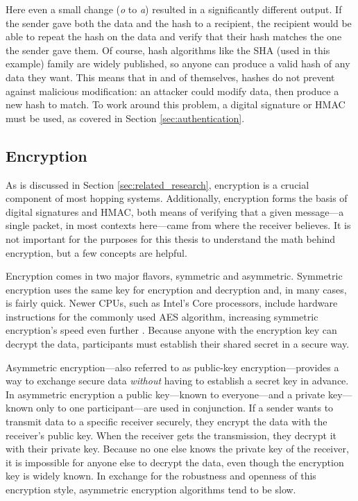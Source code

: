 \par Here even a small change (\textit{o} to \textit{a}) resulted in a significantly different output. If the sender gave both the data and the hash to a recipient, the recipient would be able to repeat the hash on the data and verify that their hash matches the one the sender gave them. Of course, hash algorithms like the \ac{SHA} (used in this example) family are widely published, so anyone can produce a valid hash of any data they want. This means that in and of themselves, hashes do not prevent against malicious modification: an attacker could modify data, then produce a new hash to match. To work around this problem, a digital signature or \ac{HMAC} must be used, as covered in Section \ref{sec:authentication}.

\subsection{Encryption}
\label{sec:encryption}
\par As is discussed in Section \ref{sec:related_research}, encryption is a crucial component of most hopping systems. Additionally, encryption forms the basis of digital signatures and \ac{HMAC}, both means of verifying that a given message---a single packet, in most contexts here---came from where the receiver believes. It is not important for the purposes for this thesis to understand the math behind encryption, but a few concepts are helpful.

\par Encryption comes in two major flavors, symmetric and asymmetric. Symmetric encryption uses the same key for encryption and decryption and, in many cases, is fairly quick. Newer \acp{CPU}, such as Intel's Core processors, include hardware instructions for the commonly used \ac{AES} algorithm, increasing symmetric encryption's speed even further \cite{IntelAES}. Because anyone with the encryption key can decrypt the data, participants must establish their shared secret in a secure way.

\par Asymmetric encryption---also referred to as public-key encryption---provides a way to exchange secure data \textit{without} having to establish a secret key in advance. In asymmetric encryption a public key---known to everyone---and a private key---known only to one participant---are used in conjunction. If a sender wants to transmit data to a specific receiver securely, they encrypt the data with the receiver's public key. When the receiver gets the transmission, they decrypt it with their private key. Because no one else knows the private key of the receiver, it is impossible for anyone else to decrypt the data, even though the encryption key is widely known. In exchange for the robustness and openness of this encryption style, asymmetric encryption algorithms tend to be slow.


